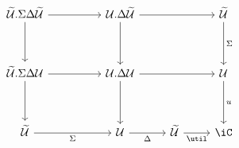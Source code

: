 \[\begin{tikzcd}
	{\Tm.\Sigma\Delta\Tm} && {\Ty.\Delta\Tm} && \Tm \\
	\\
	{\Tm.\Sigma\Delta\Ty} && {\Ty.\Delta\Ty} && \Ty \\
	\\
	\Tm && \Ty & \Tm & \iC
	\arrow["\Sigma"', from=5-1, to=5-3]
	\arrow["\Delta"', from=5-3, to=5-4]
	\arrow["\util"', from=5-4, to=5-5]
	\arrow["u", from=3-5, to=5-5]
	\arrow[from=3-3, to=5-3]
	\arrow[from=3-3, to=3-5]
	\arrow[from=3-1, to=5-1]
	\arrow[from=3-1, to=3-3]
	\arrow["\Sigma", from=1-5, to=3-5]
	\arrow[from=1-3, to=3-3]
	\arrow[from=1-3, to=1-5]
	\arrow[from=1-1, to=3-1]
	\arrow[from=1-1, to=1-3]
\end{tikzcd}\]
